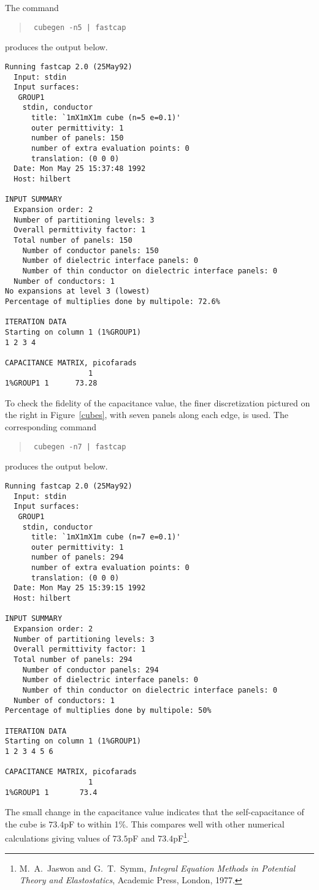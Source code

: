 The command
\begin{quote}\tt
cubegen -n5 | fastcap 
\end{quote}
produces the output below.
\begin{verbatim}
Running fastcap 2.0 (25May92)
  Input: stdin
  Input surfaces:
   GROUP1
    stdin, conductor
      title: `1mX1mX1m cube (n=5 e=0.1)'
      outer permittivity: 1
      number of panels: 150
      number of extra evaluation points: 0
      translation: (0 0 0)
  Date: Mon May 25 15:37:48 1992
  Host: hilbert

INPUT SUMMARY
  Expansion order: 2
  Number of partitioning levels: 3
  Overall permittivity factor: 1
  Total number of panels: 150
    Number of conductor panels: 150
    Number of dielectric interface panels: 0
    Number of thin conductor on dielectric interface panels: 0
  Number of conductors: 1
No expansions at level 3 (lowest)
Percentage of multiplies done by multipole: 72.6%

ITERATION DATA
Starting on column 1 (1%GROUP1)
1 2 3 4

CAPACITANCE MATRIX, picofarads
                   1
1%GROUP1 1      73.28
\end{verbatim}
To check the fidelity of the capacitance value, the finer discretization 
pictured on the right in 
Figure~\ref{cubes},
with seven panels along each edge, is used. The
corresponding command
\begin{quote}\tt
cubegen -n7 | fastcap 
\end{quote}
produces the output below.
\begin{verbatim}
Running fastcap 2.0 (25May92)
  Input: stdin
  Input surfaces:
   GROUP1
    stdin, conductor
      title: `1mX1mX1m cube (n=7 e=0.1)'
      outer permittivity: 1
      number of panels: 294
      number of extra evaluation points: 0
      translation: (0 0 0)
  Date: Mon May 25 15:39:15 1992
  Host: hilbert

INPUT SUMMARY
  Expansion order: 2
  Number of partitioning levels: 3
  Overall permittivity factor: 1
  Total number of panels: 294
    Number of conductor panels: 294
    Number of dielectric interface panels: 0
    Number of thin conductor on dielectric interface panels: 0
  Number of conductors: 1
Percentage of multiplies done by multipole: 50%

ITERATION DATA
Starting on column 1 (1%GROUP1)
1 2 3 4 5 6

CAPACITANCE MATRIX, picofarads
                   1
1%GROUP1 1       73.4
\end{verbatim}
The small change in the capacitance value indicates that the self-capacitance
of the cube is $73.4$pF to within 1\%. This compares well with 
other numerical
calculations giving values of $73.5$pF and
$73.4$pF\footnote{M.\ A.\ Jaswon and G.\ T.\ Symm,
{\em Integral Equation Methods in Potential Theory and Elastostatics},
Academic Press, London, 1977.}.

